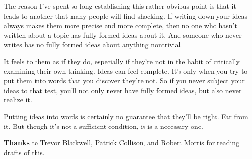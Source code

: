 The reason I've spent so long establishing this rather obvious point is
that it leads to another that many people will find shocking. If writing
down your ideas always makes them more precise and more complete, then
no one who hasn't written about a topic has fully formed ideas about it.
And someone who never writes has no fully formed ideas about anything
nontrivial.

It feels to them as if they do, especially if they're not in the habit
of critically examining their own thinking. Ideas can feel complete.
It's only when you try to put them into words that you discover they're
not. So if you never subject your ideas to that test, you'll not only
never have fully formed ideas, but also never realize it.

Putting ideas into words is certainly no guarantee that they'll be
right. Far from it. But though it's not a sufficient condition, it is a
necessary one.


\textbf{Thanks} to Trevor Blackwell, Patrick Collison, and Robert Morris
for reading drafts of this.